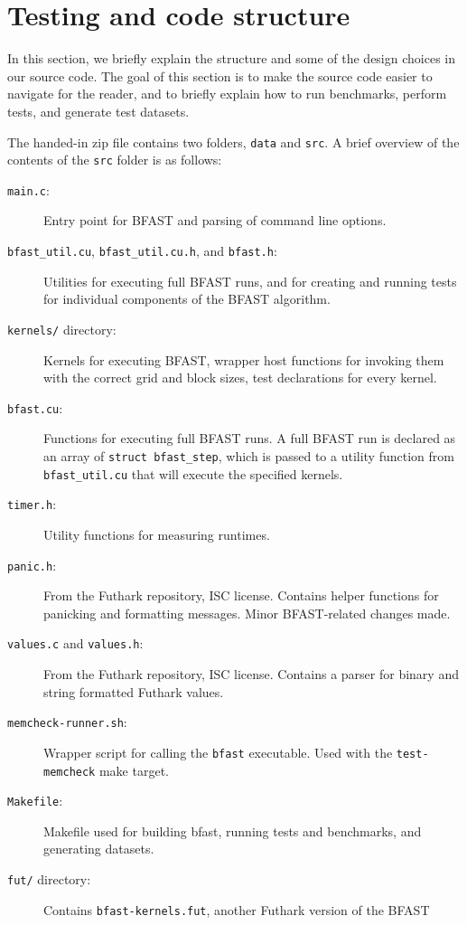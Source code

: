 \section{Testing and code structure}
In this section, we briefly explain the structure and some of the design
choices in our source code.
The goal of this section is to make the source code easier to navigate for the
reader, and to briefly explain how to run benchmarks, perform tests, and
generate test datasets.

The handed-in zip file contains two folders, \texttt{data} and \texttt{src}.
A brief overview of the contents of the \texttt{src} folder is as follows:
\begin{description}
\item[\texttt{main.c}:]
  Entry point for BFAST and parsing of command line options.
\item[\texttt{bfast\_util.cu}, \texttt{bfast\_util.cu.h}, and \texttt{bfast.h}:]
  Utilities for executing full BFAST runs, and for creating and running tests
  for individual components of the BFAST algorithm.
\item[\texttt{kernels/} directory:]
  Kernels for executing BFAST, wrapper host functions for invoking them with
  the correct grid and block sizes, test declarations for every kernel.
\item[\texttt{bfast.cu}:]
  Functions for executing full BFAST runs.
  A full BFAST run is declared as an array of \texttt{struct bfast\_step},
  which is passed to a utility function from \texttt{bfast\_util.cu} that will
  execute the specified kernels.
\item[\texttt{timer.h}:]
  Utility functions for measuring runtimes.
\item[\texttt{panic.h}:]
  From the Futhark repository, ISC license.
  Contains helper functions for panicking and formatting messages.
  Minor BFAST-related changes made.
\item[\texttt{values.c} and \texttt{values.h}:]
  From the Futhark repository, ISC license.
  Contains a parser for binary and string formatted Futhark values.
\item[\texttt{memcheck-runner.sh}:]
  Wrapper script for calling the \texttt{bfast} executable.
  Used with the \texttt{test-memcheck} make target.
\item[\texttt{Makefile}:]
  Makefile used for building bfast, running tests and benchmarks, and
  generating datasets.
\item[\texttt{fut/} directory:]
  Contains \texttt{bfast-kernels.fut}, another Futhark version of the BFAST

\end{description}
